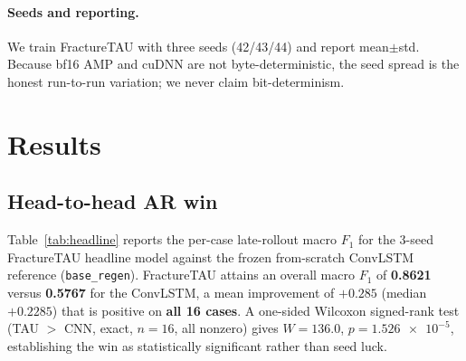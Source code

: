\documentclass[11pt]{article}
\begin{document}
\paragraph{Seeds and reporting.}
We train FractureTAU with three seeds (42/43/44) and report mean$\pm$std.
Because bf16 AMP and cuDNN are not byte-deterministic, the seed spread is the
honest run-to-run variation; we never claim bit-determinism.

\section{Results}
\label{sec:results}

\subsection{Head-to-head AR win}
\label{sec:headline}

Table~\ref{tab:headline} reports the per-case late-rollout macro $F_1$ for the
3-seed FractureTAU headline model against the frozen from-scratch ConvLSTM
reference (\texttt{base\_regen}). FractureTAU attains an overall macro $F_1$ of
\textbf{0.8621} versus \textbf{0.5767} for the ConvLSTM, a mean improvement of
$+0.285$ (median $+0.2285$) that is positive on \textbf{all 16 cases}. A
one-sided Wilcoxon signed-rank test (TAU $>$ CNN, exact, $n{=}16$, all nonzero)
gives $W{=}136.0$, $p{=}\num{1.526e-5}$, establishing the win as statistically
significant rather than seed luck.
\end{document}
